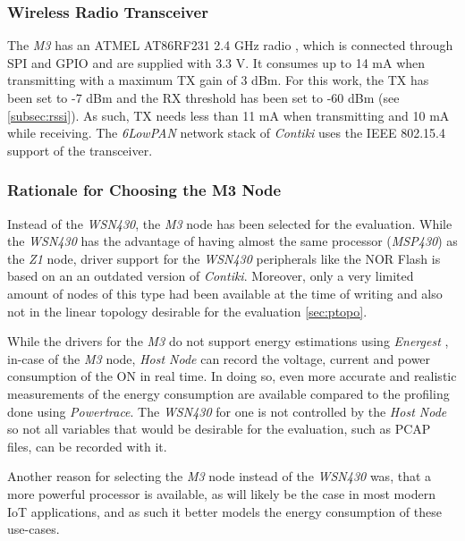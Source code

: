 \subsubsection{Wireless Radio Transceiver}

The \emph{M3} has an ATMEL AT86RF231 2.4 GHz radio \cite{AT86RF231}, which is
connected through \ac{SPI} and \ac{GPIO} and are supplied with 3.3 V. It consumes up to
14 mA when transmitting with a maximum \ac{TX} gain of 3 dBm. For this work, the
\ac{TX} has been set to -7 dBm and the \ac{RX} threshold has been set to -60 dBm
(see \autoref{subsec:rssi}). As such, \ac{TX} needs less than 11 mA when transmitting and
10 mA while receiving. The \emph{6LowPAN} network \cite{rfc4944} stack of \emph{Contiki}
uses the IEEE 802.15.4 support of the transceiver.

\subsubsection{Rationale for Choosing the M3 Node}
\label{subsubsec:reasonsm3}

Instead of the \emph{WSN430}, the \emph{M3} node has been selected for the
evaluation. While the \emph{WSN430} has the advantage of having almost the same processor
(\emph{MSP430}) as the \emph{Z1} node, driver support for the \emph{WSN430}
peripherals like the NOR Flash is based on an an outdated version of
\emph{Contiki}. Moreover, only a very limited amount of nodes of this type had
been available at the time of writing and also not in the linear topology
desirable for the evaluation \autoref{sec:ptopo}.

While the drivers for the \emph{M3} do not support energy estimations using
\emph{Energest} \cite{dunkels2011powertrace}, in-case of the \emph{M3} node,
\emph{Host Node} can record the voltage, current and power consumption of the
\ac{ON} in real time. In doing so, even more accurate and realistic measurements
of the energy consumption are available compared to the profiling done using
\emph{Powertrace}. The \emph{WSN430} for one is not controlled by the \emph{Host
Node} so not all variables that would be desirable for the evaluation, such as
\ac{PCAP} files, can be recorded with it.

Another reason for selecting the \emph{M3} node instead of the \emph{WSN430}
was, that a more powerful processor is available, as will likely be the case in
most modern \ac{IoT} applications, and as such it better models the energy
consumption of these use-cases.

